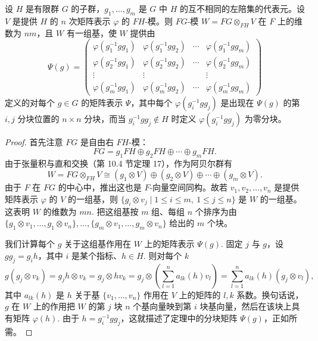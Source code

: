 \begin{theorem}\label{thm:19.11}
设 \(H\) 是有限群 \(G\) 的子群，\(g_1, \ldots, g_m\) 是 \(G\) 中 \(H\) 的互不相同的左陪集的代表元。设 \(V\) 是提供 \(H\) 的 \(n\) 次矩阵表示 \(\varphi\) 的 \(FH\)-模。则 \(FG\)-模 \(W = FG \otimes_{FH}V\) 在 \(F\) 上的维数为 \(nm\)，且 \(W\) 有一组基，使 \(W\) 提供由
\[
\Psi(g) = \begin{pmatrix}
\varphi(g_1^{-1}gg_1) & \varphi(g_1^{-1}gg_2) & \cdots & \varphi(g_1^{-1}gg_m)\\
\varphi(g_2^{-1}gg_1) & \varphi(g_2^{-1}gg_2) & \cdots & \varphi(g_2^{-1}gg_m)\\
\vdots & \vdots & & \vdots\\
\varphi(g_m^{-1}gg_1) & \varphi(g_m^{-1}gg_2) & \cdots & \varphi(g_m^{-1}gg_m)
\end{pmatrix}
\]
定义的对每个 \(g \in G\) 的矩阵表示 \(\Psi\)，其中每个 \(\varphi(g_i^{-1}gg_j)\) 是出现在 \(\Psi(g)\) 的第 \(i,j\) 分块位置的 \(n \times n\) 分块，而当 \(g_i^{-1}gg_j \notin H\) 时定义 \(\varphi(g_i^{-1}gg_j)\) 为零分块。
\end{theorem}

\begin{proof}
首先注意 \(FG\) 是自由右 \(FH\)-模：
\[
FG = g_1FH \oplus g_2FH \oplus \cdots \oplus g_mFH.
\]
由于张量积与直和交换（第 10.4 节定理 17），作为阿贝尔群有
\[
W = FG \otimes_{FH}V \cong (g_1 \otimes V) \oplus (g_2 \otimes V) \oplus \cdots \oplus (g_m \otimes V).
\]
由于 \(F\) 在 \(FG\) 的中心中，推出这也是 \(F\)-向量空间同构。故若 \(v_1, v_2, \ldots, v_n\) 是提供矩阵表示 \(\varphi\) 的 \(V\) 的一组基，则 \(\{g_i \otimes v_j \mid 1 \leq i \leq m,\ 1 \leq j \leq n\}\) 是 \(W\) 的一组基。这表明 \(W\) 的维数为 \(mn\). 把这组基按 \(m\) 组、每组 \(n\) 个排序为由 \(\{g_1 \otimes v_1, \ldots, g_1 \otimes v_n\}, \ldots, \{g_m \otimes v_1, \ldots, g_m \otimes v_n\}\) 给出的 \(m\) 个块。

我们计算每个 \(g\) 关于这组基作用在 \(W\) 上的矩阵表示 \(\Psi(g)\). 固定 \(j\) 与 \(g\)，设 \(gg_j = g_ih\)，其中 \(i\) 是某个指标、\(h \in H\). 则对每个 \(k\)
\[
g(g_j \otimes v_k) = g_jh \otimes v_k = g_j \otimes hv_k = g_j \otimes \left(\sum_{l=1}^{n}a_{lk}(h)v_l\right) = \sum_{l=1}^{n}a_{lk}(h)(g_j \otimes v_l),
\]
其中 \(a_{lk}(h)\) 是 \(h\) 关于基 \(\{v_1, \ldots, v_n\}\) 作用在 \(V\) 上的矩阵的 \(l,k\) 系数。换句话说，\(g\) 在 \(W\) 上的作用把 \(W\) 的第 \(j\) 块 \(n\) 个基向量映到第 \(i\) 块基向量，然后在该块上具有矩阵 \(\varphi(h)\). 由于 \(h = g_i^{-1}gg_j\)，这就描述了定理中的分块矩阵 \(\Psi(g)\)，正如所需。
\end{proof}

